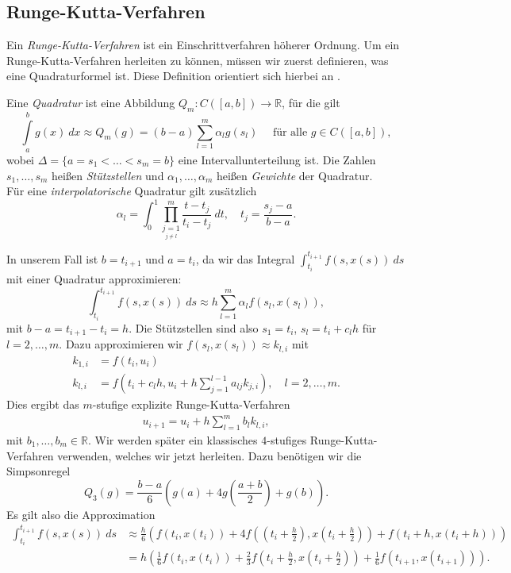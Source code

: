 \subsection{Runge-Kutta-Verfahren}
Ein \textit{Runge-Kutta-Verfahren} ist ein Einschrittverfahren höherer Ordnung. Um ein Runge-Kutta-Verfahren herleiten
zu können, müssen wir zuerst definieren, was eine Quadraturformel ist. Diese Definition orientiert sich hierbei an
\cite[Kapitel 9]{deuflhardNumerischeMathematik2018}.
\begin{definition}
    Eine {\em Quadratur} ist eine Abbildung $Q_m: C([a,b])\rightarrow \mathbb{R}$, für die gilt
    \[
        \int\limits_a^b g(x)\ dx \approx Q_m(g) = (b-a)\sum_{l=1}^{m}\alpha_l g(s_l) \quad \text{ für alle } g \in C([a,b]),
    \]
    wobei $\Delta = \{a=s_1 < \dots < s_m=b\}$ eine Intervallunterteilung ist. Die Zahlen $s_1, \dots, s_m$ heißen {\em Stützstellen}
    und $\alpha_1, \dots, \alpha_m$ heißen {\em Gewichte} der Quadratur.\\
    Für eine {\em interpolatorische} Quadratur gilt zusätzlich
    \[
        \alpha_l = \int_{0}^{1} \prod_{\underset{j\neq l}{j=1}}^{m} \frac{t-t_j}{t_i-t_j}\ dt,
        \quad t_j = \frac{s_j-a}{b-a}.
    \]
\end{definition}
In unserem Fall ist $b=t_{i+1}$ und $a=t_i$, da wir das Integral $\int_{t_i}^{t_{i+1}} f(s,x(s))\ ds$ mit einer Quadratur
approximieren:
\[
    \int_{t_i}^{t_{i+1}} f(s,x(s))\ ds \approx h \sum_{l=1}^{m}\alpha_l f(s_l,x(s_l)),
\]
mit $b-a = t_{i+1}-t_i=h$.
Die Stützstellen sind also $s_1=t_i$, $s_l=t_i+c_{l} h$ für $l = 2,\dots, m$. Dazu approximieren wir
$f(s_l,x(s_l))\approx k_{l,i}$ mit
\begin{align}
    \label{eq:rk}
    k_{1,i} &= f(t_i,u_i) \nonumber \\
    k_{l,i} &= f(t_i+c_lh, u_i + h\sum_{j=1}^{l-1}a_{lj}k_{j,i} ), \quad l=2,\dots,m.
\end{align}
Dies ergibt das $m$-stufige explizite Runge-Kutta-Verfahren
\begin{align}
    u_{i+1} = u_i + h \sum_{l=1}^{m} b_l k_{l,i},   \label{exp-rk-def}
\end{align}
mit $b_1, \dots, b_m \in \mathbb{R}$.
Wir werden später ein klassisches $4$-stufiges Runge-Kutta-Verfahren verwenden, welches wir jetzt herleiten.
Dazu benötigen wir die Simpsonregel
\[
    Q_3(g) = \frac{b-a}{6} \left(g(a) + 4g\left(\frac{a+b}{2}\right) +g(b)\right).
\]
Es gilt also die Approximation
\begin{align*}
    \int_{t_i}^{t_{i+1}} f(s,x(s)) \ ds &\approx
    \frac{h}{6}\left(f(t_i,x(t_i)) + 4f\left(\left(t_i + \frac{h}{2}\right), x\left(t_i+\frac{h}{2}\right)\right) + f(t_i + h,x(t_i + h))\right) \\
    &= h\left(\frac{1}{6}f(t_i,x(t_i)) + \frac{2}{3}f\left( t_i + \frac{h}{2}, x\left( t_i + \frac{h}{2}\right) \right)
    + \frac{1}{6}f(t_{i+1},x(t_{i+1}))\right). \\
\end{align*}
